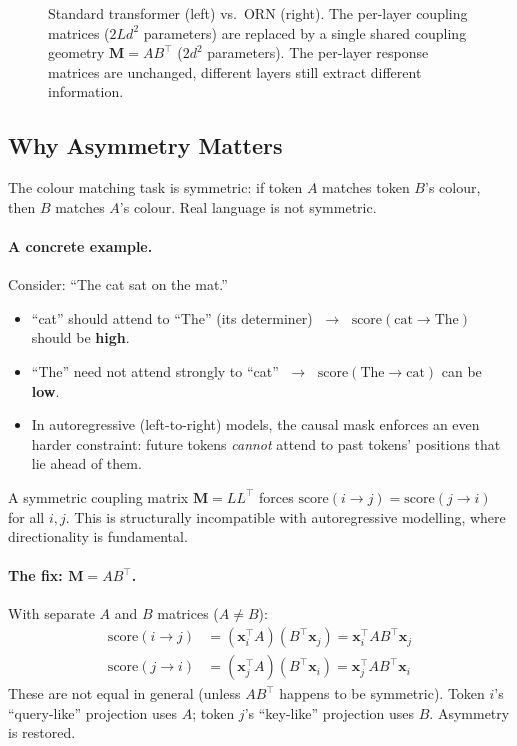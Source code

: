 \documentclass[11pt, a4paper]{article}
\newcommand{\M}{\mathbf{M}}
\newcommand{\x}{\mathbf{x}}
\theoremstyle{remark}
\begin{document}
\begin{figure}[ht]
\caption{Standard transformer (left) vs.\ ORN (right).
The \textcolor{seedred}{per-layer coupling matrices} ($2Ld^2$ parameters) are replaced by a single \textcolor{orbitblue}{shared coupling geometry} $\M = AB^\top$ ($2d^2$ parameters).
The \textcolor{targetgreen!70!black}{per-layer response matrices} are unchanged, different layers still extract different information.}
\label{fig:shared-vs-perlayer}
\end{figure}


\subsection{Why Asymmetry Matters}
\label{sec:grn:asymmetry}

The colour matching task is symmetric: if token $A$ matches token $B$'s colour, then $B$ matches $A$'s colour.
Real language is not symmetric.

\paragraph{A concrete example.}
Consider: ``The cat sat on the mat.''
\begin{itemize}[nosep]
    \item ``cat'' should attend to ``The'' (its determiner) $\;\to\;$ $\text{score}(\text{cat} \to \text{The})$ should be \textbf{high}.
    \item ``The'' need not attend strongly to ``cat'' $\;\to\;$ $\text{score}(\text{The} \to \text{cat})$ can be \textbf{low}.
    \item In autoregressive (left-to-right) models, the causal mask enforces an even harder constraint: future tokens \emph{cannot} attend to past tokens' positions that lie ahead of them.
\end{itemize}

A symmetric coupling matrix $\M = LL^\top$ forces $\text{score}(i \to j) = \text{score}(j \to i)$ for all $i, j$.
This is structurally incompatible with autoregressive modelling, where directionality is fundamental.

\paragraph{The fix: $\M = AB^\top$.}
With separate $A$ and $B$ matrices ($A \neq B$):
\begin{align*}
\text{score}(i \to j) &= (\x_i^\top A)(B^\top \x_j) = \x_i^\top A B^\top \x_j \\
\text{score}(j \to i) &= (\x_j^\top A)(B^\top \x_i) = \x_j^\top A B^\top \x_i
\end{align*}
These are not equal in general (unless $AB^\top$ happens to be symmetric).
Token $i$'s ``query-like'' projection uses $A$; token $j$'s ``key-like'' projection uses $B$.
Asymmetry is restored.
\end{document}
